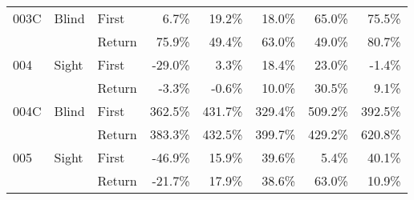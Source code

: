 \begin{table}[!htb]
\begin{tabular}{lllrrrrr}
003C & Blind & First &    6.7\% &   19.2\% &                                                18.0\% &                                                 65.0\% &   75.5\% \\
    &       & Return &   75.9\% &   49.4\% &                                                63.0\% &                                                 49.0\% &   80.7\% \\
004 & Sight & First &  -29.0\% &    3.3\% &                                                18.4\% &                                                 23.0\% &   -1.4\% \\
    &       & Return &   -3.3\% &   -0.6\% &                                                10.0\% &                                                 30.5\% &    9.1\% \\
004C & Blind & First &  362.5\% &  431.7\% &                                               329.4\% &                                                509.2\% &  392.5\% \\
    &       & Return &  383.3\% &  432.5\% &                                               399.7\% &                                                429.2\% &  620.8\% \\
005 & Sight & First &  -46.9\% &   15.9\% &                                                39.6\% &                                                  5.4\% &   40.1\% \\
    &       & Return &  -21.7\% &   17.9\% &                                                38.6\% &                                                 63.0\% &   10.9\% \\
\bottomrule
\end{tabular}
\end{table}


